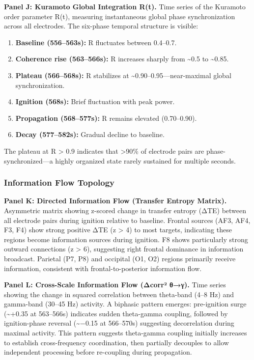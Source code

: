 \documentclass[11pt,a4paper]{article}
\begin{document}
\textbf{Panel J: Kuramoto Global Integration R(t).}
Time series of the Kuramoto order parameter R(t), measuring instantaneous global phase synchronization across all electrodes. The six-phase temporal structure is visible:
\begin{enumerate}
\item \textbf{Baseline (556–563s):} R fluctuates between 0.4–0.7.
\item \textbf{Coherence rise (563–566s):} R increases sharply from \textasciitilde{}0.5 to \textasciitilde{}0.85.
\item \textbf{Plateau (566–568s):} R stabilizes at \textasciitilde{}0.90–0.95—near-maximal global synchronization.
\item \textbf{Ignition (568s):} Brief fluctuation with peak power.
\item \textbf{Propagation (568–577s):} R remains elevated (0.70–0.90).
\item \textbf{Decay (577–582s):} Gradual decline to baseline.
\end{enumerate}
The plateau at R > 0.9 indicates that >90\% of electrode pairs are phase-synchronized—a highly organized state rarely sustained for multiple seconds.

\subsubsection{Information Flow Topology}

\textbf{Panel K: Directed Information Flow (Transfer Entropy Matrix).}
Asymmetric matrix showing z-scored change in transfer entropy (ΔTE) between all electrode pairs during ignition relative to baseline. Frontal sources (AF3, AF4, F3, F4) show strong positive ΔTE (z > 4) to most targets, indicating these regions become information sources during ignition. F8 shows particularly strong outward connections (z > 6), suggesting right frontal dominance in information broadcast. Parietal (P7, P8) and occipital (O1, O2) regions primarily receive information, consistent with frontal-to-posterior information flow.

\textbf{Panel L: Cross-Scale Information Flow (Δcorr² θ→γ).}
Time series showing the change in squared correlation between theta-band (4–8 Hz) and gamma-band (30–45 Hz) activity. A biphasic pattern emerges: pre-ignition surge (\textasciitilde{}+0.35 at 563–566s) indicates sudden theta-gamma coupling, followed by ignition-phase reversal (\textasciitilde{}−0.15 at 566–570s) suggesting decorrelation during maximal activity. This pattern suggests theta-gamma coupling initially increases to establish cross-frequency coordination, then partially decouples to allow independent processing before re-coupling during propagation.
\end{document}
